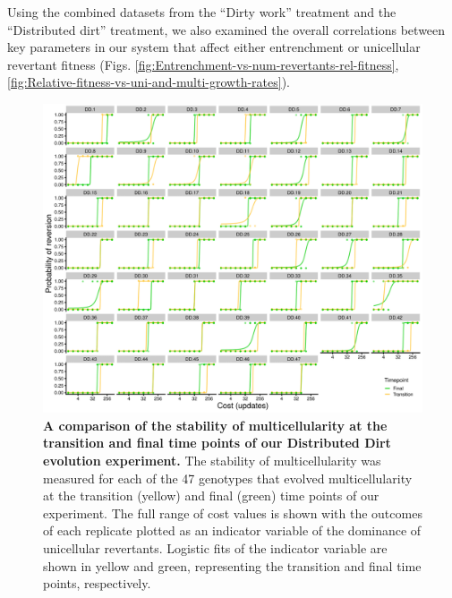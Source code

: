 \documentclass[
]{book}
\begin{document}
Using the combined datasets from the ``Dirty work'' treatment and the ``Distributed dirt'' treatment, we also examined the overall correlations between key parameters in our system that affect either entrenchment or unicellular revertant fitness (Figs. \ref{fig:Entrenchment-vs-num-revertants-rel-fitness}, \ref{fig:Relative-fitness-vs-uni-and-multi-growth-rates}).

\begin{figure}
\centering
\includegraphics{images/Figure_S10_Dist_Dirt_Entrenchment_20DEC22.png}
\caption{\label{fig:dd-entrench-comparison}\textbf{A comparison of the stability of multicellularity at the transition and final time points of our Distributed Dirt evolution experiment.} The stability of multicellularity was measured for each of the 47 genotypes that evolved multicellularity at the transition (yellow) and final (green) time points of our experiment. The full range of cost values is shown with the outcomes of each replicate plotted as an indicator variable of the dominance of unicellular revertants. Logistic fits of the indicator variable are shown in yellow and green, representing the transition and final time points, respectively.}
\end{figure}
\end{document}
